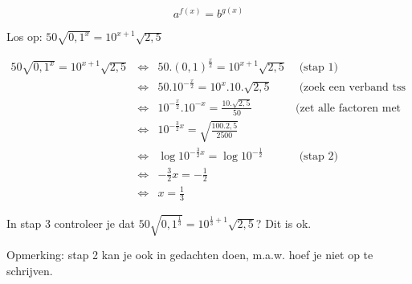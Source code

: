 \begin{voorbeeld}
	
\begin{equation*}
a^{f(x)}=b^{g(x)}
\end{equation*}

Los op: $50\sqrt{0,1^{x}}=10^{x+1}\sqrt{2,5}$

\begin{equation*}
 \begin{array}{rclr}
 50\sqrt{0,1^{x}}=10^{x+1}\sqrt{2,5} & 
	\iff & 50.\left(0,1\right)^{\frac{x}{2}} = 10^{x+1}\sqrt{2,5} & \text{ (stap 1)}\\
	&\iff & 50.10^{-\frac{x}{2}} = 10^{x}.10.\sqrt{2,5} & \text{ (zoek een verband tss 0,1 en 10)}\\
	&\iff & 10^{-\frac{x}{2}}.10^{-x} = \frac{10.\sqrt{2,5}}{50} & \textrm{(zet alle factoren met x bij elkaar)}\\
	&\iff & 10^{-\frac{3}{2}x} = \sqrt{\frac{100.2,5}{2500}}\\
	&\iff & \log10^{-\frac{3}{2}x} = \log10^{-\frac{1}{2}} & \text{ (stap 2)}\\
	&\iff & -\frac{3}{2}x = -\frac{1}{2} & \text{}\\
	&\iff & x = \frac{1}{3} & 
	\end{array}
\end{equation*}

In stap 3 controleer je dat $ 50\sqrt{0,1^{\frac{1}{3}}}=10^{\frac{1}{3}+1}\sqrt{2,5}$? Dit is ok.

Opmerking: stap 2 kan je ook in gedachten doen, m.a.w. hoef je niet
op te schrijven.
\end{voorbeeld}


